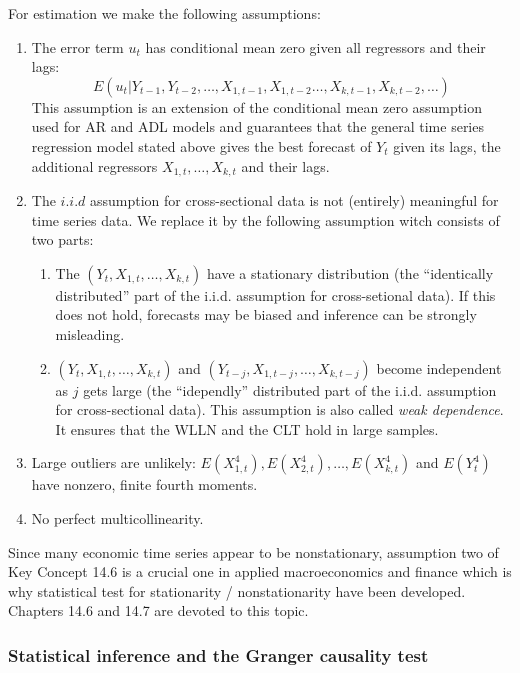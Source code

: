 \documentclass[]{book}
\theoremstyle{definition}
\theoremstyle{definition}
\theoremstyle{definition}
\theoremstyle{remark}
\begin{document}
For estimation we make the following assumptions:

\begin{enumerate}
\def\labelenumi{\arabic{enumi}.}
\item
  The error term \(u_t\) has conditional mean zero given all regressors
  and their lags:
  \[E(u_t\vert Y_{t-1}, Y_{t-2}, \dots, X_{1,t-1}, X_{1,t-2} \dots, X_{k,t-1}, X_{k,t-2}, \dots)\]
  This assumption is an extension of the conditional mean zero
  assumption used for AR and ADL models and guarantees that the general
  time series regression model stated above gives the best forecast of
  \(Y_t\) given its lags, the additional regressors
  \(X_{1,t},\dots,X_{k,t}\) and their lags.
\item
  The \(i.i.d\) assumption for cross-sectional data is not (entirely)
  meaningful for time series data. We replace it by the following
  assumption witch consists of two parts:

  \begin{enumerate}
  \def\labelenumii{(\alph{enumii})}
  \item
    The \((Y_{t}, X_{1,t}, \dots, X_{k,t})\) have a stationary
    distribution (the ``identically distributed'' part of the i.i.d.
    assumption for cross-setional data). If this does not hold,
    forecasts may be biased and inference can be strongly misleading.
  \item
    \((Y_{t}, X_{1,t}, \dots, X_{k,t})\) and
    \((Y_{t-j}, X_{1,t-j}, \dots, X_{k,t-j})\) become independent as
    \(j\) gets large (the ``idependly'' distributed part of the i.i.d.
    assumption for cross-sectional data). This assumption is also called
    \emph{weak dependence}. It ensures that the WLLN and the CLT hold in
    large samples.
  \end{enumerate}
\item
  Large outliers are unlikely:
  \(E(X_{1,t}^4), E(X_{2,t}^4), \dots, E(X_{k,t}^4)\) and \(E(Y_t^4)\)
  have nonzero, finite fourth moments.
\item
  No perfect multicollinearity.
\end{enumerate}

Since many economic time series appear to be nonstationary, assumption
two of Key Concept 14.6 is a crucial one in applied macroeconomics and
finance which is why statistical test for stationarity / nonstationarity
have been developed. Chapters 14.6 and 14.7 are devoted to this topic.

\subsubsection*{Statistical inference and the Granger causality
test}\label{statistical-inference-and-the-granger-causality-test}
\end{document}
